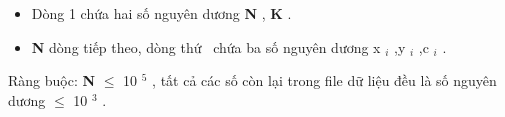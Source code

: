 \begin{itemize}
	\item     Dòng 1 chứa hai số nguyên dương    \textbf{     N    }    ,    \textbf{     K    }    .   
	\item \textbf{     N    }    dòng tiếp theo, dòng thứ     chứa ba số nguyên dương x    $_     i    $    ,y    $_     i    $    ,c    $_     i    $    .   
\end{itemize}

   Ràng buộc:   \textbf{    N   }    $\le$ 10   $^    5   $   , tất cả các số còn lại trong file dữ liệu đều là số nguyên dương  $\le$ 10   $^    3   $   .  

\